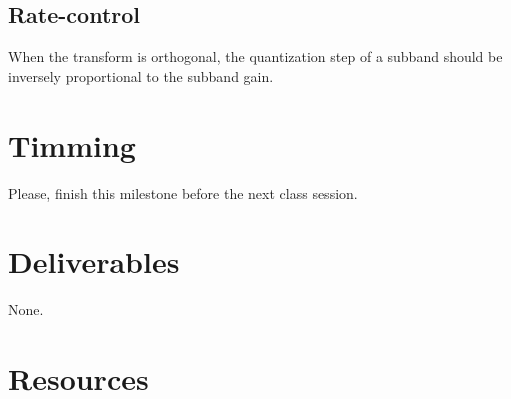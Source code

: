 \subsection{Rate-control}
When the transform is orthogonal, the quantization step of a subband should be inversely proportional to the subband gain.  

\section{Timming}

Please, finish this milestone before the next class session.

\section{Deliverables}

None.

\section{Resources}

\renewcommand{\addcontentsline}[3]{}%

